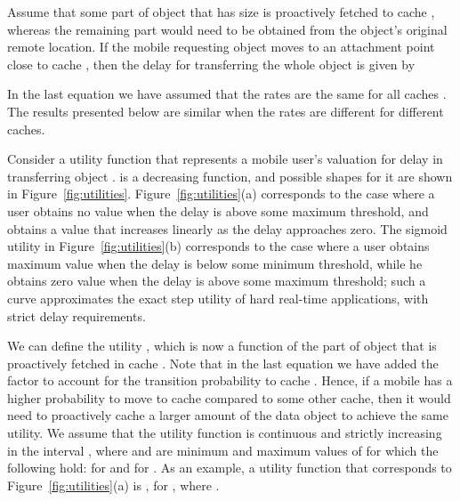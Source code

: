 \documentclass[conference]{IEEEtran}
\begin{document}
Assume that some part  of object  that has size  is proactively fetched to  cache  , whereas the remaining part  would need to be obtained from the object's original remote location. If  the mobile requesting object  moves to an attachment point close to cache , then the delay for transferring the whole object  is given by

In the last equation we have assumed that the rates  are the same for all caches . The results presented below are similar when the rates are different for different caches.

Consider a utility function  that represents a mobile user's valuation for delay  in transferring object .  is a decreasing function, and possible shapes for it are shown in Figure~\ref{fig:utilities}. Figure~\ref{fig:utilities}(a) corresponds to the case where a user obtains no value when the delay is above some maximum threshold, and obtains  a value that increases linearly as the delay approaches zero.
The sigmoid utility in Figure~\ref{fig:utilities}(b) corresponds to the case where a user obtains maximum value when the delay is below some minimum threshold, while he obtains zero value when the delay is above some maximum threshold; such a curve approximates the exact step utility of hard real-time applications, with strict delay requirements.

We can define the utility , which is now a function of the part  of  object  that is proactively fetched in cache .
Note that in the last equation we have added the factor  to account for the transition probability to cache . Hence, if a mobile has a higher probability to move to cache  compared to some other cache, then it would need to proactively cache a larger amount of the data object to achieve the same utility.
We assume that the utility function   is continuous and strictly increasing  in the interval , where  and  are minimum and maximum values of  for which the following hold:
 for  and  for .
As an example, a utility function that corresponds to Figure~\ref{fig:utilities}(a) is , for , where .
\end{document}
